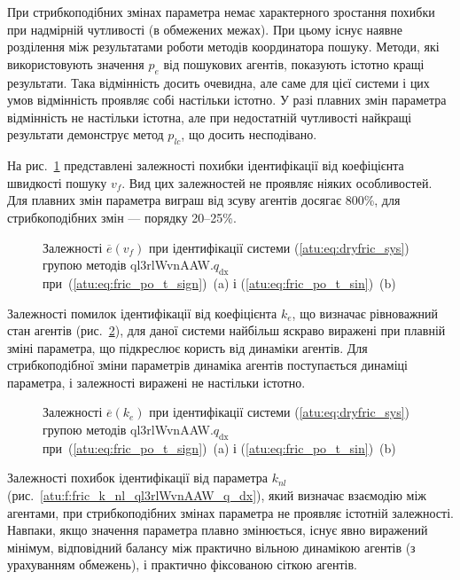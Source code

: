 При стрибкоподібних змінах параметра немає характерного
зростання похибки при надмірній чутливості (в обмежених
межах). При цьому існує наявне розділення між результатами
роботи методів координатора пошуку. Методи, які використовують
значення
$ p_e $ від пошукових агентів, показують істотно кращі
результати. Така відмінність досить очевидна, але саме для цієї
системи і цих умов відмінність проявляє собі настільки істотно. У разі плавних
змін параметра відмінність не настільки істотна, але при
недостатній чутливості найкращі результати демонструє метод
$p_{lc}$, що досить несподівано.


На рис.~\ref{atu:f:fric_v_f_ql3rlWvnAAW_q_dx} представлені залежності похибки
ідентифікації від коефіцієнта швидкості пошуку
$v_f$. Вид цих залежностей не проявляє ніяких особливостей. Для
плавних змін параметра виграш від зсуву агентів досягає
800\%, для стрибкоподібних змін --- порядку 20--25\%.

\begin{figure}[htb!]
  \caption{Залежності $\overline{e}(v_f)$ при ідентифікації системи (\ref{atu:eq:dryfric_sys}) групою методів ql3rlWvnAAW.$q_\mathrm{dx} $ при~(\ref{atu:eq:fric_po_t_sign})~(a) і (\ref{atu:eq:fric_po_t_sin})~(b)}
\label{atu:f:fric_v_f_ql3rlWvnAAW_q_dx}
\end{figure}

Залежності помилок ідентифікації від коефіцієнта
$ k_e $, що визначає рівноважний стан агентів
(рис.~\ref{atu:f:fric_k_e_ql3rlWvnAAW_q_dx}), для даної системи найбільш яскраво
виражені при плавній зміні параметра, що підкреслює користь
від динаміки агентів. Для стрибкоподібної зміни параметрів
динаміка агентів поступається динаміці параметра, і залежності
виражені не настільки істотно.

\begin{figure}[htb!]
  \caption{Залежності $\overline{e}(k_e)$ при ідентифікації системи (\ref{atu:eq:dryfric_sys}) групою методів ql3rlWvnAAW.$q_\mathrm{dx} $ при~(\ref{atu:eq:fric_po_t_sign})~(a) і (\ref{atu:eq:fric_po_t_sin})~(b)}
  \label{atu:f:fric_k_e_ql3rlWvnAAW_q_dx}
\end{figure}

Залежності похибок ідентифікації від параметра
$k_{nl} $ (рис.~\ref{atu:f:fric_k_nl_ql3rlWvnAAW_q_dx}), який визначає взаємодію між
агентами, при стрибкоподібних змінах параметра не проявляє
істотній залежності. Навпаки, якщо значення
параметра плавно змінюється, існує явно виражений мінімум, відповідний балансу між
практично вільною динамікою агентів (з урахуванням обмежень),
і практично фіксованою сіткою агентів.

